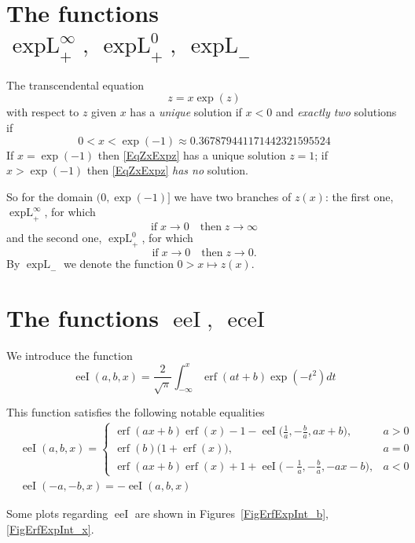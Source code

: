 \documentclass[12pt,reqno,intlimits,twoside]{amsart}
\DeclareMathOperator{\erf}{erf}%
\DeclareMathOperator{\expL}{expL}%
\DeclareMathOperator{\eeI}{eeI}%
\DeclareMathOperator{\eceI}{eceI}%
\begin{document}
\section{The functions $\expL_+^{\infty},\ \expL_+^{0}, \ \expL_-$}\label{SectExpLin}

The transcendental equation
\begin{equation}\label{EqZxExpz}
   z = x\exp(z)
\end{equation}
with respect to $z$ given $x$ has a \emph{unique} solution if $x < 0$ and \emph{exactly two} solutions if
\begin{equation*}
   0 < x < \exp(-1) \approx 0.367879441171442321595524
\end{equation*}
If $x = \exp(-1)$ then \eqref{EqZxExpz}  has a unique solution $z = 1$; if $x > \exp(-1)$
then \eqref{EqZxExpz}  \emph{has no} solution.

So for the domain $(0, \exp(-1)]$ we have two branches of $z(x)$: the first one,  $\expL_+^{\infty}$, for which
$$
   \text{if}\;x\rightarrow0\quad\text{then}\;z\rightarrow\infty
$$
and the second one, $\expL_+^{0}$, for which
$$
   \text{if}\;x\rightarrow0\quad\text{then}\;z\rightarrow0.
$$
By $\expL_-$ we denote the function $0 > x \mapsto z(x)$.

\section{The functions $\eeI,\ \eceI$}\label{SectErfExpInt}
We introduce the function
\begin{equation}\label{EqErfExpInt}
   \eeI(a, b, x) =
   \frac{2}{\sqrt{\pi}}
   \int_{-\infty}^{x}\!\erf(at + b)\exp(-t^2)dt
\end{equation}

This function satisfies the following notable equalities
\begin{align*}
  &
  \eeI(a, b, x) =
  \left\{
    \begin{array}{ll}
       \erf(ax + b)\erf(x) - 1 - \eeI\big(\frac{1}{a}, -\frac{b}{a}, ax + b\big), &         a > 0 \\
       \erf(b)\big(1 + \erf(x)\big),  &  a = 0 \\
       \erf(ax + b)\erf(x) + 1 + \eeI\big(-\frac{1}{a}, -\frac{b}{a}, -ax - b\big),   &      a < 0
    \end{array}
  \right.\\
  &
  \eeI(-a, -b, x) = -\eeI(a, b, x)
\end{align*}

Some plots regarding $\eeI$ are shown in Figures~\ref{FigErfExpInt_b},\:\ref{FigErfExpInt_x}.
\end{document}
